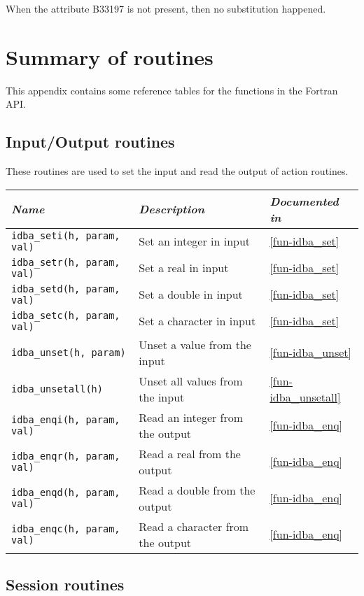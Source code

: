\documentclass[final,12pt,a4paper,twoside]{book}
\begin{document}
When the attribute B33197 is not present, then no substitution happened.


\chapter{Summary of routines}

This appendix contains some reference tables for the functions in the Fortran
API.

\section{Input/Output routines}

These routines are used to set the input and read the output of action routines.

\begin{tabular}{|l|l|l|}
\hline
{\em Name}                      & {\em Description}                & {\em Documented in} \\
\hline
{\tt idba\_seti(h, param, val)} & Set an integer in input          & \ref{fun-idba_set} \\
{\tt idba\_setr(h, param, val)} & Set a real in input              & \ref{fun-idba_set} \\
{\tt idba\_setd(h, param, val)} & Set a double in input            & \ref{fun-idba_set} \\
{\tt idba\_setc(h, param, val)} & Set a character in input         & \ref{fun-idba_set} \\
{\tt idba\_unset(h, param)}     & Unset a value from the input     & \ref{fun-idba_unset} \\
{\tt idba\_unsetall(h)}         & Unset all values from the input  & \ref{fun-idba_unsetall} \\
{\tt idba\_enqi(h, param, val)} & Read an integer from the output  & \ref{fun-idba_enq} \\
{\tt idba\_enqr(h, param, val)} & Read a real from the output      & \ref{fun-idba_enq} \\
{\tt idba\_enqd(h, param, val)} & Read a double from the output    & \ref{fun-idba_enq} \\
{\tt idba\_enqc(h, param, val)} & Read a character from the output & \ref{fun-idba_enq} \\
\hline
\end{tabular}


\section{Session routines}
\end{document}
